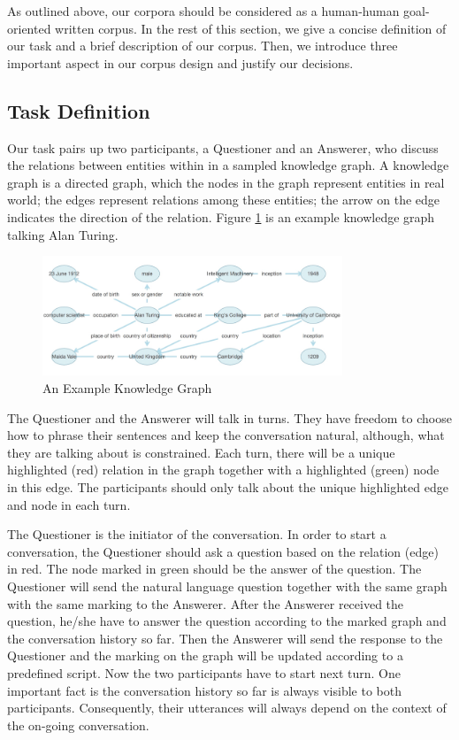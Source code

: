 \documentclass[bsc,frontabs,twoside,singlespacing,parskip,deptreport]{infthesis}     %
\begin{document}
As outlined above, our corpora should be considered as a human-human goal-oriented written corpus. In the rest of this section, we give a concise definition of our task and a brief description of our corpus. Then, we introduce three important aspect in our corpus design and justify our decisions.

\subsection{Task Definition}

Our task pairs up two participants, a Questioner and an Answerer, who discuss the relations between entities within in a sampled knowledge graph. A knowledge graph is a directed graph, which the nodes in the graph represent entities in real world; the edges represent relations among these entities; the arrow on the edge indicates the direction of the relation. Figure \ref{fig:kg} is an example knowledge graph talking Alan Turing. 

\begin{figure}[h]
    \centering
    \includegraphics[width=0.80\textwidth]{kg.png}
    \caption{An Example Knowledge Graph}
    \label{fig:kg}
\end{figure}


The Questioner and the Answerer will talk in turns. They have freedom to choose how to phrase their sentences and keep the conversation natural, although, what they are talking about is constrained. Each turn, there will be a unique highlighted (red) relation in the graph together with a highlighted (green) node in this edge. The participants should only talk about the unique highlighted edge and node in each turn.

The Questioner is the initiator of the conversation. In order to start a conversation, the Questioner should ask a question based on the relation (edge) in red. The node marked in green should be the answer of the question. The Questioner will send the natural language question together with the same graph with the same marking to the Answerer. After the Answerer received the question, he/she have to answer the question according to the marked graph and the conversation history so far. Then the Answerer will send the response to the Questioner and the marking on the graph will be updated according to a predefined script. Now the two participants have to start next turn. One important fact is the conversation history so far is always visible to both participants. Consequently, their utterances will always depend on the context of the on-going conversation.
\end{document}
